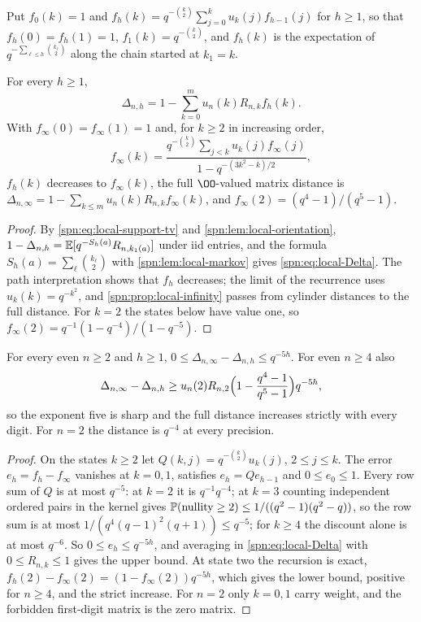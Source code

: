 Put $f_0(k)=1$ and $f_h(k)=q^{-\binom k2}\sum_{j=0}^ku_k(j)f_{h-1}(j)$ for $h\ge1$, so that
$f_h(0)=f_h(1)=1$, $f_1(k)=q^{-\binom k2}$, and $f_h(k)$ is the expectation of
$q^{-\sum_{\ell\le h}\binom{k_\ell}2}$ along the chain started at $k_1=k$.

\begin{theorem}\label{spn:thm:local-precision}
For every $h\ge1$,
\begin{equation}\label{spn:eq:local-Delta}
 \Delta_{n,h}=1-\sum_{k=0}^mu_n(k)R_{n,k}f_h(k).
\end{equation}
With $f_\infty(0)=f_\infty(1)=1$ and, for $k\ge2$ in increasing order,
\[
 f_\infty(k)=\frac{q^{-\binom k2}\sum_{j<k}u_k(j)f_\infty(j)}{1-q^{-(3k^2-k)/2}},
\]
$f_h(k)$ decreases to $f_\infty(k)$, the full $\OO$-valued matrix distance is
$\Delta_{n,\infty}=1-\sum_{k\le m}u_n(k)R_{n,k}f_\infty(k)$, and $f_\infty(2)=(q^4-1)/(q^5-1)$.
\end{theorem}
\begin{proof}
By \eqref{spn:eq:local-support-tv} and \cref{spn:lem:local-orientation},
$1-\Delta_{n,h}=\mathbb{E}[q^{-S_h(a)}R_{n,k_1(a)}]$ under iid entries, and the formula
$S_h(a)=\sum_\ell\binom{k_\ell}2$ with \cref{spn:lem:local-markov} gives \eqref{spn:eq:local-Delta}. The
path interpretation shows that $f_h$ decreases; the limit of the recurrence uses $u_k(k)=q^{-k^2}$, and
\cref{spn:prop:local-infinity} passes from cylinder distances to the full distance. For $k=2$ the
states below have value one, so $f_\infty(2)=q^{-1}(1-q^{-4})/(1-q^{-5})$.
\end{proof}

\begin{theorem}\label{spn:thm:local-five}
For every even $n\ge2$ and $h\ge1$, $0\le\Delta_{n,\infty}-\Delta_{n,h}\le q^{-5h}$. For even $n\ge4$
also
\[
 \Delta_{n,\infty}-\Delta_{n,h}\ge u_n(2)R_{n,2}\Bigl(1-\frac{q^4-1}{q^5-1}\Bigr)q^{-5h},
\]
so the exponent five is sharp and the full distance increases strictly with every digit. For $n=2$
the distance is $q^{-4}$ at every precision.
\end{theorem}
\begin{proof}
On the states $k\ge2$ let $Q(k,j)=q^{-\binom k2}u_k(j)$, $2\le j\le k$. The error
$e_h=f_h-f_\infty$ vanishes at $k=0,1$, satisfies $e_h=Qe_{h-1}$ and $0\le e_0\le1$. Every row sum of
$Q$ is at most $q^{-5}$: at $k=2$ it is $q^{-1}q^{-4}$; at $k=3$ counting independent ordered pairs in
the kernel gives $\mathbb{P}(\text{nullity}\ge2)\le1/((q^2-1)(q^2-q))$, so the row sum is at most
$1/(q^4(q-1)^2(q+1))\le q^{-5}$; for $k\ge4$ the discount alone is at most $q^{-6}$. So
$0\le e_h\le q^{-5h}$, and averaging in \eqref{spn:eq:local-Delta} with $0\le R_{n,k}\le1$ gives the upper
bound. At state two the recursion is exact, $f_h(2)-f_\infty(2)=(1-f_\infty(2))q^{-5h}$, which gives the
lower bound, positive for $n\ge4$, and the strict increase. For $n=2$ only $k=0,1$ carry weight, and
the forbidden first-digit matrix is the zero matrix.
\end{proof}

